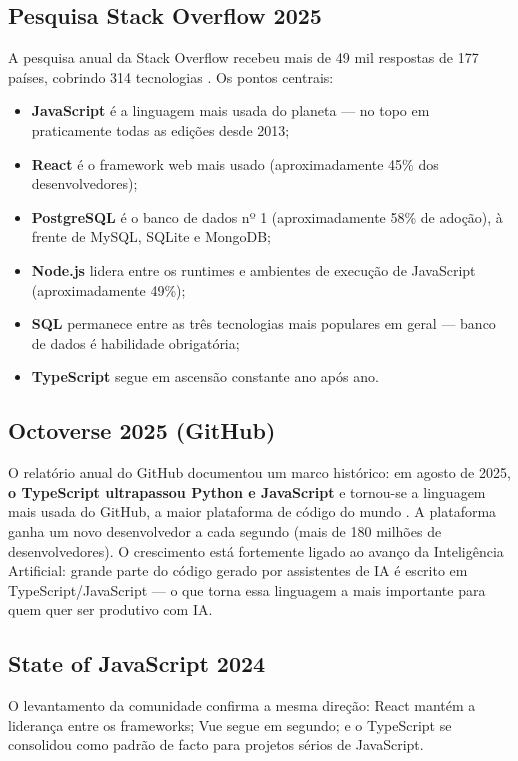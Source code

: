 \subsection{Pesquisa Stack Overflow 2025}
A pesquisa anual da Stack Overflow recebeu mais de 49 mil respostas de 177
países, cobrindo 314 tecnologias \cite{so2025,so2025geral}. Os pontos centrais:
\begin{itemize}[leftmargin=*, itemsep=0.3em]
  \item \textbf{JavaScript} é a linguagem mais usada do planeta — no topo em
  praticamente todas as edições desde 2013;
  \item \textbf{React} é o framework web mais usado (aproximadamente 45\% dos
  desenvolvedores);
  \item \textbf{PostgreSQL} é o banco de dados nº 1 (aproximadamente 58\% de
  adoção), à frente de MySQL, SQLite e MongoDB;
  \item \textbf{Node.js} lidera entre os runtimes e ambientes de execução de
  JavaScript (aproximadamente 49\%);
  \item \textbf{SQL} permanece entre as três tecnologias mais populares em
  geral — banco de dados é habilidade obrigatória;
  \item \textbf{TypeScript} segue em ascensão constante ano após ano.
\end{itemize}

\subsection{Octoverse 2025 (GitHub)}
O relatório anual do GitHub documentou um marco histórico: em agosto de 2025,
\textbf{o TypeScript ultrapassou Python e JavaScript} e tornou-se a linguagem
mais usada do GitHub, a maior plataforma de código do mundo \cite{octoverse2025}.
A plataforma ganha um novo desenvolvedor a cada segundo (mais de 180 milhões de
desenvolvedores). O crescimento está fortemente ligado ao avanço da
Inteligência Artificial: grande parte do código gerado por assistentes de IA é
escrito em TypeScript/JavaScript — o que torna essa linguagem a mais importante
para quem quer ser produtivo com IA.

\subsection{State of JavaScript 2024}
O levantamento da comunidade \cite{stateofjs2024} confirma a mesma direção:
React mantém a liderança entre os frameworks; Vue segue em segundo; e o
TypeScript se consolidou como padrão de facto para projetos sérios de
JavaScript.

